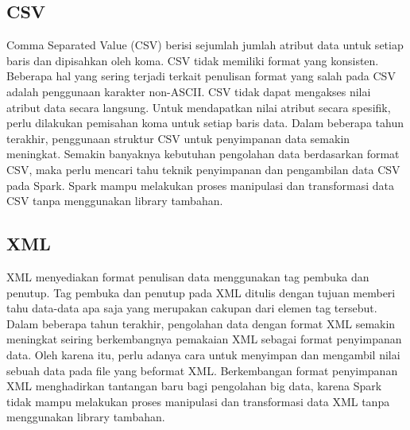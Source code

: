 \subsection{CSV}
Comma Separated Value (CSV) berisi sejumlah jumlah atribut data untuk setiap baris dan dipisahkan oleh koma. CSV tidak memiliki format yang konsisten. Beberapa hal yang sering terjadi terkait penulisan format yang salah pada CSV adalah penggunaan karakter non-ASCII. CSV tidak dapat mengakses nilai atribut data secara langsung. Untuk mendapatkan nilai atribut secara spesifik, perlu dilakukan pemisahan koma untuk setiap baris data. Dalam beberapa tahun terakhir, penggunaan struktur CSV untuk penyimpanan data semakin meningkat. Semakin banyaknya kebutuhan pengolahan data berdasarkan format CSV, maka perlu mencari tahu teknik penyimpanan dan pengambilan data CSV pada Spark. Spark mampu melakukan proses manipulasi dan transformasi data CSV tanpa menggunakan library tambahan.

\subsection{XML}
XML menyediakan format penulisan data menggunakan tag pembuka dan penutup. Tag pembuka dan penutup pada XML ditulis dengan tujuan memberi tahu data-data apa saja yang merupakan cakupan dari elemen tag tersebut. Dalam beberapa tahun terakhir, pengolahan data dengan format XML semakin meningkat seiring berkembangnya pemakaian XML sebagai format penyimpanan data.  Oleh karena itu, perlu adanya cara untuk menyimpan dan mengambil nilai sebuah data pada file yang beformat XML. Berkembangan format penyimpanan XML menghadirkan tantangan baru bagi pengolahan big data, karena Spark tidak mampu melakukan proses manipulasi dan transformasi data XML tanpa menggunakan  library tambahan.
